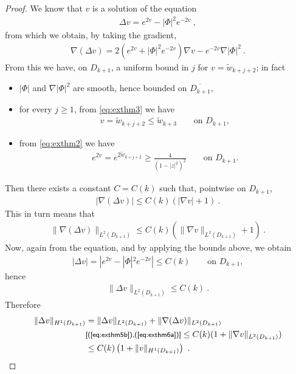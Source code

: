 \documentclass[a4paper,11pt,openright,twoside]{book}
\newcommand{\1}{\mathds{1}}
\newcommand{\commb}[1]{\textsf{{\footnotesize[#1]}}}
\newcommand{\qref}[1]{(\ref{#1})}
\theoremstyle{plain}
\theoremstyle{definition}
\theoremstyle{remark}
\begin{document}
\begin{proof}
	We know that $v$ is a solution of the equation
	\begin{align*}
		\Delta v = e^{2v}-|\Phi|^2 e^{-2v}
	\ , 
	\end{align*}
	from which we obtain, by taking the gradient,
	\begin{align*}
		\nabla ( \Delta v ) = 2(e^{2v}+|\Phi|^2 e^{-2v})\nabla v - e^{-2v}\nabla|\Phi|^2
	\ . 
	\end{align*}
	From this we have, on $D_{k+1}$, a uniform bound in $j$ for $v=\tilde w_{k+j+2}$; in fact
	\begin{itemize}[noitemsep]
		\item[$\vartriangleright$] $|\Phi|$ and $\nabla|\Phi|^2$ are smooth, hence bounded on $\overline{D_{k+1}}$,
		\item[$\vartriangleright$] for every $j\geq 1$, from \eqref{eq:exthm3} we have 
		\begin{align*}
			v = \tilde w_{k+j+2} \leq \tilde w_{k+3}
		\qquad \text{on } D_{k+1},
		\end{align*}
		\item[$\vartriangleright$] from \eqref{eq:exthm2} we have 
		\begin{align}\label{eq:exthm4}
			e^{2v}=e^{2\tilde w_{k+j+2}} \geq \frac{4}{(1-|z|^2)^2}
		\qquad \text{on } D_{k+1}.
		\end{align}
	\end{itemize}
	Then there exists a constant $C=C(k)$ such that, pointwise on $D_{k+1}$,
	\begin{align*}
		|\nabla (\Delta v) | \leq C(k)( |\nabla v| + 1)
	\ . 
	\end{align*}
	This in turn means that
	\begin{align}\label{eq:exthm6a}
		\|\nabla ( \Delta v) \|_{L^2(D_{k+1})} \leq C(k)( \|\nabla v\|_{L^2(D_{k+1})} +1)
	\ . 
	\end{align}
	Now, again from the equation, and by applying the bounds above, we obtain
	\begin{align}\label{eq:exthm5}
		|\Delta v| = |e^{2v} -|\Phi|^2e^{-2v}| \leq C(k)\qquad \text{on }D_{k+1},
	\end{align}
	hence
	\begin{align}\label{eq:exthm5b}
		\|\Delta v\|_{L^2(D_{k+1})} \leq C(k)
	\ . 
	\end{align}
	Therefore
	\begin{align}\label{eq:exthm6}
		\|\Delta v\|_{H^1(D_{k+1})} &= \|\Delta v\|_{L^2(D_{k+1})}+\|\nabla(\Delta v)\|_{L^2(D_{k+1})}\notag\\
		&\commb{\qref{eq:exthm5b},\qref{eq:exthm6a}}\leq C(k) (1+\|\nabla v\|_{L^2(D_{k+1})}) \notag\\
		&\leq C(k) \left( 1+ \|v\|_{H^1(D_{k+1})} \right) 
	\ . 
	\end{align}


\end{proof}
\end{document}
